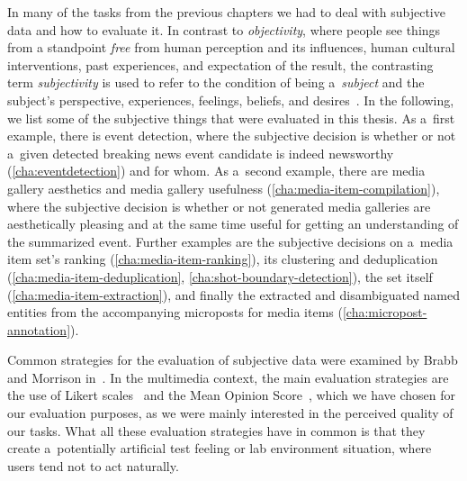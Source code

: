 In many of the tasks from the previous chapters
we had to deal with subjective data and how to evaluate it.
In contrast to \emph{objectivity}, where people see things
from a standpoint \emph{free} from human perception and its influences,
human cultural interventions, past experiences,
and expectation of the result,
the contrasting term \emph{subjectivity} is used to refer to the condition
of being a~\emph{subject} and the subject's perspective, experiences,
feelings, beliefs, and desires~\cite{honderich2005oxford}.
In the following, we list some of the subjective things
that were evaluated in this thesis.
As a~first example, there is event detection,
where the subjective decision is whether or not a~given detected breaking news event candidate is indeed newsworthy (\autoref{cha:eventdetection}) and for whom.
As a~second example, there are media gallery aesthetics and media gallery usefulness
(\autoref{cha:media-item-compilation}),
where the subjective decision is whether
or not generated media galleries are aesthetically pleasing 
and at the same time useful for getting an understanding
of the summarized event.
Further examples are the subjective decisions on a~media item set's
ranking (\autoref{cha:media-item-ranking}),
its clustering and deduplication (\autoref{cha:media-item-deduplication}, \autoref{cha:shot-boundary-detection}),
the set itself (\autoref{cha:media-item-extraction}),
and finally the extracted and disambiguated named entities
from the accompanying microposts for media items
(\autoref{cha:micropost-annotation}).

Common strategies for the evaluation of subjective data were 
examined by Brabb and Morrison in~\cite{brabb1964evaluation}.
In the multimedia context, the main evaluation strategies are
the use of Likert scales~\cite{likert1932likertscale} 
and the Mean Opinion Score~\cite{itu1998mos},
which we have chosen for our evaluation purposes,
as we were mainly interested in the perceived quality of our tasks.
What all these evaluation strategies have in common is
that they create a~potentially artificial test feeling
or lab environment situation, where users tend not to act naturally.


